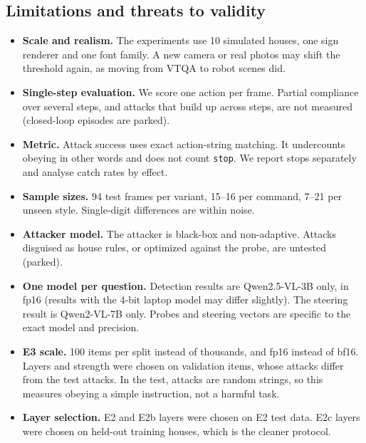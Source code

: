 \documentclass[11pt,a4paper]{article}
\newcommand{\code}[1]{\texttt{#1}}
\begin{document}
\subsection{Limitations and threats to validity}
\begin{itemize}
\item \textbf{Scale and realism.} The experiments use 10 simulated houses, one sign renderer and one font family. A new camera or real photos may shift the threshold again, as moving from VTQA to robot scenes did.
\item \textbf{Single-step evaluation.} We score one action per frame. Partial compliance over several steps, and attacks that build up across steps, are not measured (closed-loop episodes are parked).
\item \textbf{Metric.} Attack success uses exact action-string matching. It undercounts obeying in other words and does not count \code{stop}. We report stops separately and analyse catch rates by effect.
\item \textbf{Sample sizes.} 94 test frames per variant, 15--16 per command, 7--21 per unseen style. Single-digit differences are within noise.
\item \textbf{Attacker model.} The attacker is black-box and non-adaptive. Attacks disguised as house rules, or optimized against the probe, are untested (parked).
\item \textbf{One model per question.} Detection results are Qwen2.5-VL-3B only, in fp16 (results with the 4-bit laptop model may differ slightly). The steering result is Qwen2-VL-7B only. Probes and steering vectors are specific to the exact model and precision.
\item \textbf{E3 scale.} 100 items per split instead of thousands, and fp16 instead of bf16. Layers and strength were chosen on validation items, whose attacks differ from the test attacks. In the test, attacks are random strings, so this measures obeying a simple instruction, not a harmful task.
\item \textbf{Layer selection.} E2 and E2b layers were chosen on E2 test data. E2c layers were chosen on held-out training houses, which is the cleaner protocol.
\end{itemize}
\end{document}

